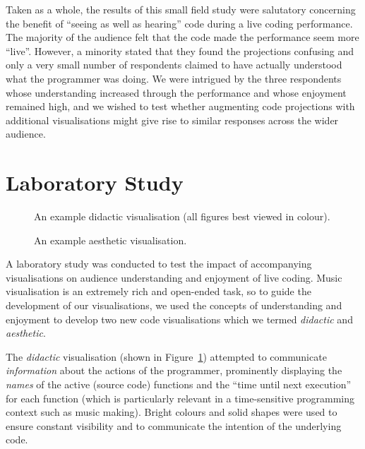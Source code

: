 \documentclass{sig-alternate}
\begin{document}
Taken as a whole, the results of this small field study were
salutatory concerning the benefit of ``seeing as well as hearing''
code during a live coding performance. The majority of the audience
felt that the code made the performance seem more ``live''. However, a
minority stated that they found the projections confusing and only a
very small number of respondents claimed to have actually understood
what the programmer was doing. We were intrigued by the three
respondents whose understanding increased through the performance and
whose enjoyment remained high, and we wished to test whether
augmenting code projections with additional visualisations might give
rise to similar responses across the wider audience.

\section{Laboratory Study}

\begin{figure}
\centering
{}
\caption{An example didactic visualisation (all
  figures best viewed in colour).}
\label{fig:didactic-visualisation}
\end{figure}

\begin{figure}
\centering
{}
\caption{An example aesthetic visualisation.}
\label{fig:aesthetic-visualisation}
\end{figure}

A laboratory study was conducted to test the impact of accompanying
visualisations on audience understanding and enjoyment of live coding.
Music visualisation is an extremely rich and open-ended task, so to
guide the development of our visualisations, we used the concepts of
understanding and enjoyment to develop two new code visualisations
which we termed \emph{didactic} and \emph{aesthetic}.

The \emph{didactic} visualisation (shown in
Figure~\ref{fig:didactic-visualisation}) attempted to communicate
\emph{information} about the actions of the programmer, prominently
displaying the \emph{names} of the active (source code) functions and
the ``time until next execution'' for each function (which is
particularly relevant in a time-sensitive programming context such as
music making). Bright colours and solid shapes were used to ensure
constant visibility and to communicate the intention of the underlying
code.
\end{document}
